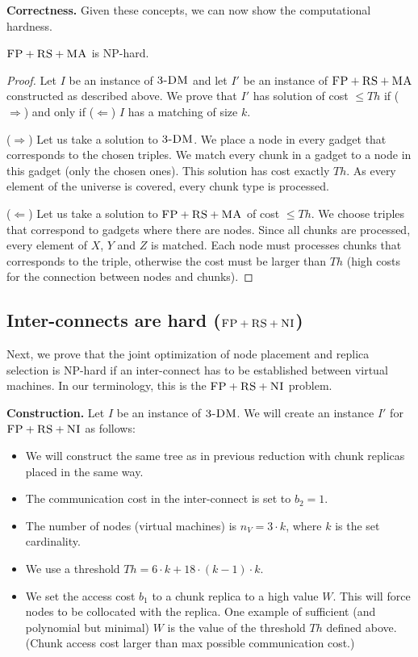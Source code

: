 \documentclass[9pt]{sigcomm-alternate}
\newcommand{\maciek}[1]{\textcolor{brown}{maciek: #1}}
\newcommand{\CC}{\textsc{NI}}
\newcommand{\FP}{\textsc{FP}}
\newcommand{\RS}{\textsc{RS}}
\newcommand{\MA}{\textsc{MA}}
\newcommand{\CostTrans}{\ensuremath{b_1}}
\newcommand{\CostCom}{\ensuremath{b_2}}
\newcommand{\Vms}{\ensuremath{n_V}}
\newcommand{\TDM}{\textsc{3-DM}}
\newcommand{\Thr}{\ensuremath{Th}}
\begin{document}
\textbf{Correctness.}
Given these concepts, we can now show the computational hardness.
\begin{theorem}
$\FP+\RS+\MA$ is NP-hard.
\end{theorem}
\begin{proof}
Let $I$ be an instance of $\TDM$ and let $I'$ be an instance of
$\FP+\RS+\MA$ constructed as described above.
We prove that $I'$ has solution of cost $\leq \Thr$ if ($\Rightarrow$) and only if
($\Leftarrow$)
$I$ has a matching of size $k$.

($\Rightarrow$) Let us take a solution to $\TDM$. We place a node in every
gadget that corresponds to the chosen triples. We match every chunk in a
gadget to a node in this gadget (only the chosen ones). This solution has
cost exactly $\Thr$. As every element of the universe is covered, every
chunk type is processed.

($\Leftarrow$) Let us take a solution to $\FP+\RS+\MA$ of cost $\leq \Thr$. We
choose triples that correspond to gadgets where there are nodes. Since
all chunks are processed, every element of $X$, $Y$ and $Z$ is matched. Each
node must processes chunks that corresponds to the triple, otherwise the
cost must be larger than $\Thr$ (high costs for the connection between
nodes and chunks).
\end{proof}


\subsection{Inter-connects are hard ($\FP+\RS+\CC$)}\label{ssec:fprscc}

Next, we prove that the joint optimization of node placement and replica selection
is NP-hard if an inter-connect has to be established between virtual machines.
In our terminology, this is the $\FP+\RS+\CC$ problem.

\textbf{Construction.}
Let $I$ be an instance of $\TDM$. We will create an instance $I'$
for $\FP+\RS+\CC$ as follows:
\begin{itemize}
\item We will construct the same tree as in previous reduction with
chunk replicas placed in the same way.
\item The communication cost in the inter-connect is set to $\CostCom = 1$.
\item The number of nodes (virtual machines) is $\Vms = 3 \cdot k$, where $k$ is the set cardinality. 
\item We use a threshold $\Thr =  6 \cdot k + 18 \cdot
(k - 1) \cdot k$.  
\item We set the access cost $\CostTrans$ to a chunk replica to a high value $W$. This will force
nodes to be collocated with the replica. One example of sufficient
(and polynomial but minimal) $W$
is the value of the threshold $\Thr$ defined above. (Chunk access cost larger than max possible
communication cost.)
\end{itemize}
\end{document}
